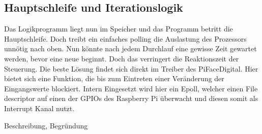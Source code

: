 \subsection{Hauptschleife und Iterationslogik}
Das Logikprogramm liegt nun im Speicher und das Programm betritt die Hauptschleife. Doch treibt ein einfaches polling die Auslastung des Prozessors unnötig nach oben. Nun könnte nach jedem Durchlauf eine gewisse Zeit gewartet werden, bevor eine neue beginnt. Doch das verringert die Reaktionszeit der Steuerung. Die beste Lösung findet sich direkt im Treiber des PiFaceDigital. Hier bietet sich eine Funktion, die bis zum Eintreten einer Veränderung der  Eingangswerte blockiert. Intern Eingesetzt wird hier ein Epoll, welcher einen File descriptor auf einen der GPIOs des Raspberry Pi überwacht und diesen somit als Interrupt Kanal nutzt. 


Beschreibung, Begründung
 
\clearpage
